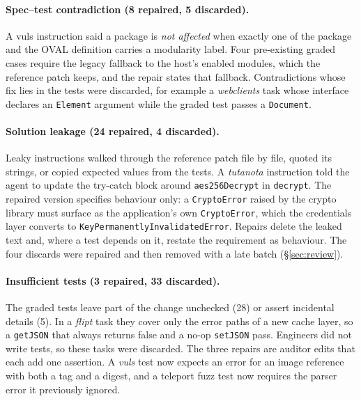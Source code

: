 \paragraph{Spec--test contradiction (8 repaired, 5 discarded).}
A vuls instruction said a package is \textit{not affected} when exactly one of the package and the OVAL definition carries a modularity label. Four pre-existing graded cases require the legacy fallback to the host's enabled modules, which the reference patch keeps, and the repair states that fallback. Contradictions whose fix lies in the tests were discarded, for example a \textit{webclients} task whose interface declares an \texttt{Element} argument while the graded test passes a \texttt{Document}.

\paragraph{Solution leakage (24 repaired, 4 discarded).}
Leaky instructions walked through the reference patch file by file, quoted its strings, or copied expected values from the tests. A \textit{tutanota} instruction told the agent to update the try-catch block around \texttt{aes256Decrypt} in \texttt{decrypt}. The repaired version specifies behaviour only: a \texttt{CryptoError} raised by the crypto library must surface as the application's own \texttt{CryptoError}, which the credentials layer converts to \texttt{KeyPermanentlyInvalidatedError}. Repairs delete the leaked text and, where a test depends on it, restate the requirement as behaviour. The four discards were repaired and then removed with a late batch (\S\ref{sec:review}).

\paragraph{Insufficient tests (3 repaired, 33 discarded).}
The graded tests leave part of the change unchecked (28) or assert incidental details (5). In a \textit{flipt} task they cover only the error paths of a new cache layer, so a \texttt{getJSON} that always returns false and a no-op \texttt{setJSON} pass. Engineers did not write tests, so these tasks were discarded. The three repairs are auditor edits that each add one assertion. A \textit{vuls} test now expects an error for an image reference with both a tag and a digest, and a teleport fuzz test now requires the parser error it previously ignored. 

